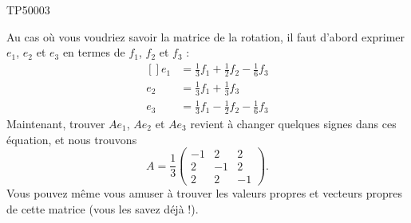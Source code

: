 \begin{corrige}{TP50003}
\begin{enumerate}
		      Au cas où vous voudriez savoir la matrice de la rotation, il faut d'abord exprimer $e_1$, $e_2$ et $e_3$ en termes de $f_1$, $f_2$ et $f_3$ :
		      \begin{equation}
			      \begin{aligned}[]
				      e_1 & =\frac{1}{ 3 }f_1+\frac{1}{ 2 }f_2-\frac{1}{ 6 }f_3 \\
				      e_2 & =\frac{1}{ 3 }f_1+\frac{1}{ 3 }f_3                  \\
				      e_3 & =\frac{1}{ 3 }f_1-\frac{1}{ 2 }f_2-\frac{1}{ 6 }f_3
			      \end{aligned}
		      \end{equation}
		      Maintenant, trouver $Ae_1$, $Ae_2$ et $Ae_3$ revient à changer quelques signes dans ces équation, et nous trouvons
		      \begin{equation}
			      A=\frac{1}{ 3 }\begin{pmatrix}
				      -1 & 2  & 2  \\
				      2  & -1 & 2  \\
				      2  & 2  & -1
			      \end{pmatrix}.
		      \end{equation}
		      Vous pouvez même vous amuser à trouver les valeurs propres et vecteurs propres de cette matrice (vous les savez déjà !).


\end{enumerate}
\end{corrige}
